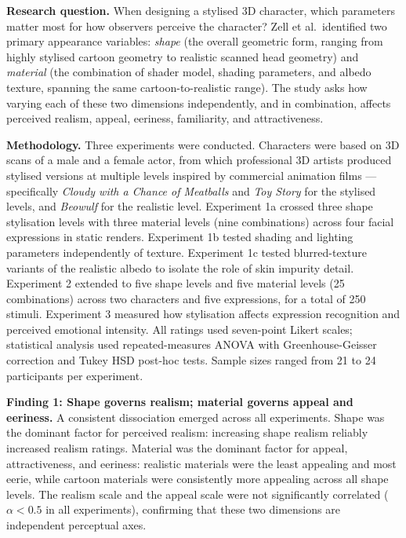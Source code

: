 \documentclass[11pt, a4paper]{article}
\begin{document}
\textbf{Research question.} When designing a stylised 3D character, which parameters matter most for how observers perceive the character? Zell et al.\ identified two primary appearance variables: \textit{shape} (the overall geometric form, ranging from highly stylised cartoon geometry to realistic scanned head geometry) and \textit{material} (the combination of shader model, shading parameters, and albedo texture, spanning the same cartoon-to-realistic range). The study asks how varying each of these two dimensions independently, and in combination, affects perceived realism, appeal, eeriness, familiarity, and attractiveness.

\textbf{Methodology.} Three experiments were conducted. Characters were based on 3D scans of a male and a female actor, from which professional 3D artists produced stylised versions at multiple levels inspired by commercial animation films --- specifically \textit{Cloudy with a Chance of Meatballs} and \textit{Toy Story} for the stylised levels, and \textit{Beowulf} for the realistic level. Experiment 1a crossed three shape stylisation levels with three material levels (nine combinations) across four facial expressions in static renders. Experiment 1b tested shading and lighting parameters independently of texture. Experiment 1c tested blurred-texture variants of the realistic albedo to isolate the role of skin impurity detail. Experiment 2 extended to five shape levels and five material levels (25 combinations) across two characters and five expressions, for a total of 250 stimuli. Experiment 3 measured how stylisation affects expression recognition and perceived emotional intensity. All ratings used seven-point Likert scales; statistical analysis used repeated-measures ANOVA with Greenhouse-Geisser correction and Tukey HSD post-hoc tests. Sample sizes ranged from 21 to 24 participants per experiment.

\textbf{Finding 1: Shape governs realism; material governs appeal and eeriness.} A consistent dissociation emerged across all experiments. Shape was the dominant factor for perceived realism: increasing shape realism reliably increased realism ratings. Material was the dominant factor for appeal, attractiveness, and eeriness: realistic materials were the least appealing and most eerie, while cartoon materials were consistently more appealing across all shape levels. The realism scale and the appeal scale were not significantly correlated ($\alpha < 0.5$ in all experiments), confirming that these two dimensions are independent perceptual axes.
\end{document}
